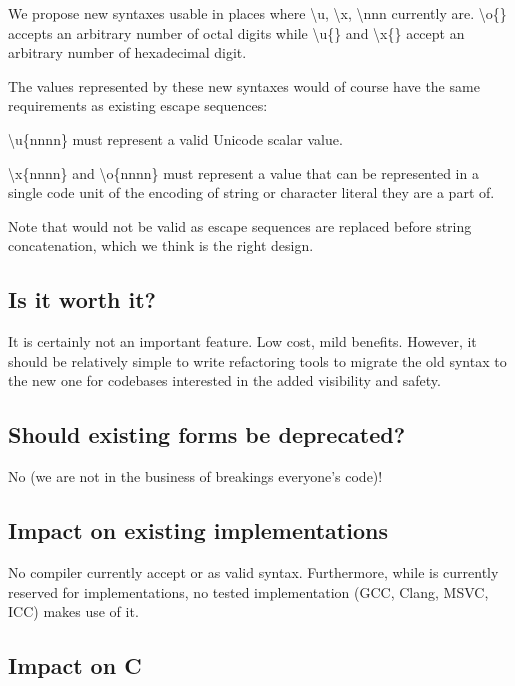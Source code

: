\documentclass{wg21}
\begin{document}
We propose new syntaxes  usable in places where
\textbackslash u, \textbackslash x, \textbackslash nnn currently are.
\textbackslash o\{\} accepts an arbitrary number of octal digits while \textbackslash u\{\} and \textbackslash x\{\} accept
an arbitrary number of hexadecimal digit.

The values represented by these new syntaxes would of course have the same requirements as existing escape sequences:

\textbackslash u\{nnnn\} must represent a valid Unicode scalar value.

\textbackslash x\{nnnn\} and \textbackslash o\{nnnn\} must represent a value that can be represented in a single code unit of the encoding of string or character literal they are a part of.

Note that  would not be valid as escape sequences are replaced before string concatenation, which we think is the right design.


\subsection{Is it worth it?}

It is certainly not an important feature. Low cost, mild benefits.
However, it should be relatively simple to write refactoring tools to migrate the old syntax to the new one for codebases interested in the added visibility and safety.


\subsection{Should existing forms be deprecated?}

No (we are not in the business of breakings everyone's code)!

\subsection{Impact on existing implementations}

No compiler currently accept  or  as valid syntax.
Furthermore, while  is currently reserved for implementations, no tested implementation (GCC, Clang, MSVC, ICC) makes use of it.


\subsection{Impact on C}
\end{document}
